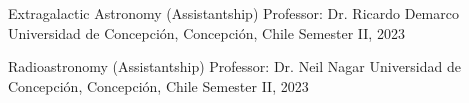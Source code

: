 
\begin{cventries}

  \cventry
    {Extragalactic Astronomy (Assistantship)}
    {Professor: Dr. Ricardo Demarco}
    {Universidad de Concepción, Concepción, Chile}
    {Semester II, 2023}
    {}

  \cventry
    {Radioastronomy (Assistantship)}
    {Professor: Dr. Neil Nagar}
    {Universidad de Concepción, Concepción, Chile}
    {Semester II, 2023}
    {}
    
\end{cventries}
